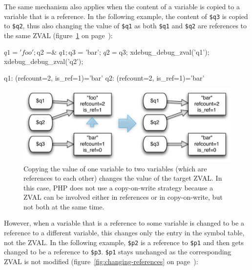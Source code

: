 The same mechanism also applies when the content of a variable is copied to a variable that is a reference. In the following example, the content of \texttt{\$q3} is copied to \texttt{\$q2}, thus also changing the value of \texttt{\$q1} as both \texttt{\$q1} and \texttt{\$q2} are references to the same ZVAL (figure~\ref{fig:copying-value-to-reference} on page~\pageref{fig:copying-value-to-reference}):

\begin{phpcode}
$q1 = 'foo';
$q2 =& $q1;

$q3 = 'bar';
$q2 = $q3;
xdebug_debug_zval('q1');
xdebug_debug_zval('q2');
\end{phpcode}

\begin{textcode}
q1: (refcount=2, is_ref=1)='bar'
q2: (refcount=2, is_ref=1)='bar'
\end{textcode}

\begin{figure}[!h]
  \begin{center}
    \includegraphics[scale=0.8]{images/q1_q2_q3}
    \caption{Copying the value of one variable to two variables (which are references to each other) changes the value of the target ZVAL. In this case, PHP does not use a copy-on-write strategy because a ZVAL can be involved either in references or in copy-on-write, but not both at the same time.}
    \label{fig:copying-value-to-reference}
  \end{center}
\end{figure}



However, when a variable that is a reference to some variable is changed to be a reference to a different variable, this changes only the entry in the symbol table, not the ZVAL. In the following example, \texttt{\$p2} is a reference to \texttt{\$p1} and then gets changed to be a reference to \texttt{\$p3}. \texttt{\$p1} stays unchanged as the corresponding ZVAL is not modified (figure~\ref{fig:changing-references} on page~\pageref{fig:changing-references}):

